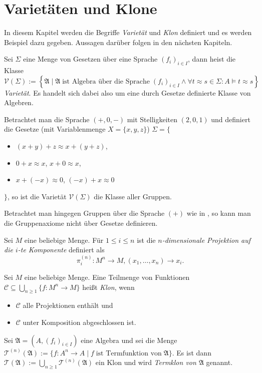 \section{Varietäten und Klone}
In diesem Kapitel werden die Begriffe \emph{Varietät} und \emph{Klon} definiert und es werden Beispiel dazu gegeben. Aussagen darüber folgen in den nächsten Kapiteln.

\begin{definition}
    Sei $\Sigma$ eine Menge von Gesetzen über eine Sprache $(f_i)_{i \in I}$, dann heist die Klasse
    $$ \mathcal{V}(\Sigma) := \left\{ \mathfrak{A} \mid \mathfrak{A} \;\text{ist Algebra über die Sprache}\; (f_i)_{i \in I} \land \forall t \approx s \in \Sigma: A\models t\approx s \right\} $$
    \emph{Varietät}. Es handelt sich dabei also um eine durch Gesetze definierte Klasse von Algebren.
\end{definition}

\begin{example}
    Betrachtet man die Sprache $(+, 0, -)$ mit Stelligkeiten $(2, 0, 1)$ und definiert die Gesetze (mit Variablenmenge $X = \{x,y,z\}$) $\Sigma = \{$
    \begin{itemize}[label={}]
        \item $(x + y) + z \approx x + (y + z)$,
        \item $0 + x \approx x$, $x + 0 \approx x$,
        \item $x + (-x) \approx 0$, $(-x) + x \approx 0$
    \end{itemize}
    $\}$, so ist die Varietät $\mathcal{V}(\Sigma)$ die Klasse aller Gruppen.
    
    Betrachtet man hingegen Gruppen über die Sprache $(+)$ wie in , so kann man die Gruppenaxiome nicht über Gesetze definieren.
\end{example}

\begin{definition}
    Sei $M$ eine beliebige Menge. Für $1 \le i \le n$ ist die \emph{$n$-dimensionale Projektion auf die $i$-te Komponente} definiert als
    $$ \pi_i^{(n)}: M^n \to M, (x_1, \ldots, x_n) \to x_i. $$
\end{definition}

\begin{definition}
    Sei $M$ eine beliebige Menge. Eine Teilmenge von Funktionen $\mathcal{C} \subseteq \bigcup_{n \ge 1} \{f: M^n \to M\}$ heißt \emph{Klon}, wenn 
    \begin{itemize}[label={--}]
        \item $\mathcal{C}$ alle Projektionen enthält und
        \item $\mathcal{C}$ unter Komposition abgeschlossen ist.
    \end{itemize}
\end{definition}

\begin{definition}
    Sei $\mathfrak{A} = (A, (f_i)_{i \in I})$ eine Algebra und sei die Menge $\mathcal{T}^{(n)}(\mathfrak{A}) := \{f: A^n \to A\mid f\;\text{ist Termfunktion von}\;\mathfrak{A}\}$. Es ist dann $\mathcal{T}(\mathfrak{A}) := \bigcup_{n \ge 1} \mathcal{T}^{(n)}(\mathfrak{A})$ ein Klon und wird \emph{Termklon von $\mathfrak{A}$} genannt.
\end{definition}